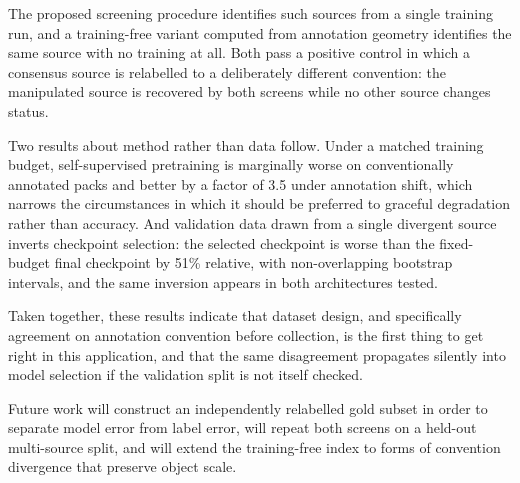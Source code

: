 The proposed screening procedure identifies such sources from a single training run,
and a training-free variant computed from annotation geometry identifies the same
source with no training at all. Both pass a positive control in which a consensus
source is relabelled to a deliberately different convention: the manipulated source is
recovered by both screens while no other source changes status.

Two results about method rather than data follow. Under a matched training budget,
self-supervised pretraining is marginally worse on conventionally annotated packs and
better by a factor of 3.5 under annotation shift, which narrows the circumstances in
which it should be preferred to graceful degradation rather than accuracy. And
validation data drawn from a single divergent source inverts checkpoint selection: the
selected checkpoint is worse than the fixed-budget final checkpoint by 51\% relative,
with non-overlapping bootstrap intervals, and the same inversion appears in both
architectures tested.

Taken together, these results indicate that dataset design, and specifically agreement
on annotation convention before collection, is the first thing to get right in this
application, and that the same disagreement propagates silently into model selection
if the validation split is not itself checked.

Future work will construct an independently relabelled gold subset in order to
separate model error from label error, will repeat both screens on a held-out
multi-source split, and will extend the training-free index to forms of convention
divergence that preserve object scale.
